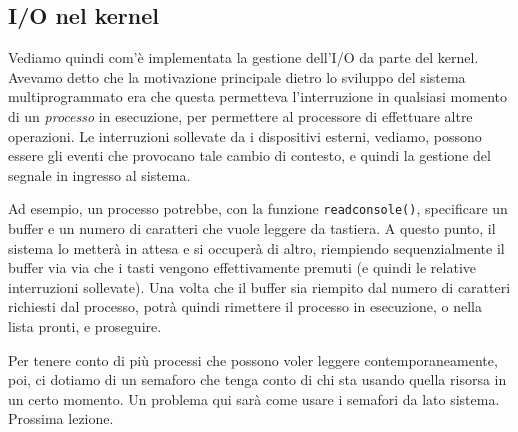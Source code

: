 \documentclass[a4paper,11pt]{article}
\begin{document}
\subsection{I/O nel kernel}
Vediamo quindi com'è implementata la gestione dell'I/O da parte del kernel.
Avevamo detto che la motivazione principale dietro lo sviluppo del sistema multiprogrammato era che questa permetteva l'interruzione in qualsiasi momento di un \textit{processo} in esecuzione, per permettere al processore di effettuare altre operazioni.
Le interruzioni sollevate da i dispositivi esterni, vediamo, possono essere gli eventi che provocano tale cambio di contesto, e quindi la gestione del segnale in ingresso al sistema.

Ad esempio, un processo potrebbe, con la funzione \lstinline|readconsole()|, specificare un buffer e un numero di caratteri che vuole leggere da tastiera.
A questo punto, il sistema lo metterà in attesa e si occuperà di altro, riempiendo sequenzialmente il buffer via via che i tasti vengono effettivamente premuti (e quindi le relative interruzioni sollevate).
Una volta che il buffer sia riempito dal numero di caratteri richiesti dal processo, potrà quindi rimettere il processo in esecuzione, o nella lista pronti, e proseguire.

Per tenere conto di più processi che possono voler leggere contemporaneamente, poi, ci dotiamo di un semaforo che tenga conto di chi sta usando quella risorsa in un certo momento.
Un problema qui sarà come usare i semafori da lato sistema. Prossima lezione.
\end{document}
